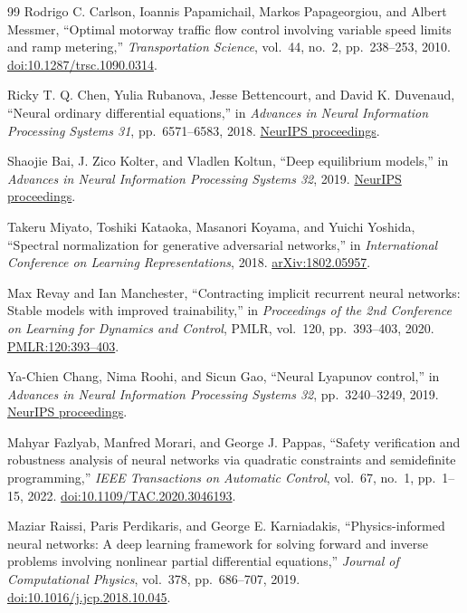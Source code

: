 \documentclass[11pt,a4paper,openany]{book}
\numberwithin{equation}{chapter}
\numberwithin{figure}{chapter}
\numberwithin{table}{chapter}
\begin{document}
\begin{thebibliography}{99}
Rodrigo C. Carlson, Ioannis Papamichail, Markos Papageorgiou, and Albert Messmer,
``Optimal motorway traffic flow control involving variable speed limits and ramp metering,''
\emph{Transportation Science}, vol.~44, no.~2, pp.~238--253, 2010.
\href{https://doi.org/10.1287/trsc.1090.0314}{doi:10.1287/trsc.1090.0314}.

Ricky T. Q. Chen, Yulia Rubanova, Jesse Bettencourt, and David K. Duvenaud,
``Neural ordinary differential equations,''
in \emph{Advances in Neural Information Processing Systems 31}, pp.~6571--6583, 2018.
\href{https://proceedings.neurips.cc/paper/2018/hash/69386f6bb1dfed68692a24c8686939b9-Abstract.html}{NeurIPS proceedings}.

Shaojie Bai, J. Zico Kolter, and Vladlen Koltun,
``Deep equilibrium models,''
in \emph{Advances in Neural Information Processing Systems 32}, 2019.
\href{https://proceedings.neurips.cc/paper/2019/hash/01386bd6d8e091c2ab4c7c7de644d37b-Abstract.html}{NeurIPS proceedings}.

Takeru Miyato, Toshiki Kataoka, Masanori Koyama, and Yuichi Yoshida,
``Spectral normalization for generative adversarial networks,''
in \emph{International Conference on Learning Representations}, 2018.
\href{https://arxiv.org/abs/1802.05957}{arXiv:1802.05957}.

Max Revay and Ian Manchester,
``Contracting implicit recurrent neural networks: Stable models with improved trainability,''
in \emph{Proceedings of the 2nd Conference on Learning for Dynamics and Control},
PMLR, vol.~120, pp.~393--403, 2020.
\href{https://proceedings.mlr.press/v120/revay20a.html}{PMLR:120:393--403}.

Ya-Chien Chang, Nima Roohi, and Sicun Gao,
``Neural Lyapunov control,''
in \emph{Advances in Neural Information Processing Systems 32}, pp.~3240--3249, 2019.
\href{https://proceedings.neurips.cc/paper/2019/hash/2647c1dba23bc0e0f9cdf75339e120d2-Abstract.html}{NeurIPS proceedings}.

Mahyar Fazlyab, Manfred Morari, and George J. Pappas,
``Safety verification and robustness analysis of neural networks via quadratic constraints and semidefinite programming,''
\emph{IEEE Transactions on Automatic Control}, vol.~67, no.~1, pp.~1--15, 2022.
\href{https://doi.org/10.1109/TAC.2020.3046193}{doi:10.1109/TAC.2020.3046193}.

Maziar Raissi, Paris Perdikaris, and George E. Karniadakis,
``Physics-informed neural networks: A deep learning framework for solving forward and inverse problems involving nonlinear partial differential equations,''
\emph{Journal of Computational Physics}, vol.~378, pp.~686--707, 2019.
\href{https://doi.org/10.1016/j.jcp.2018.10.045}{doi:10.1016/j.jcp.2018.10.045}.


\end{thebibliography}
\end{document}
